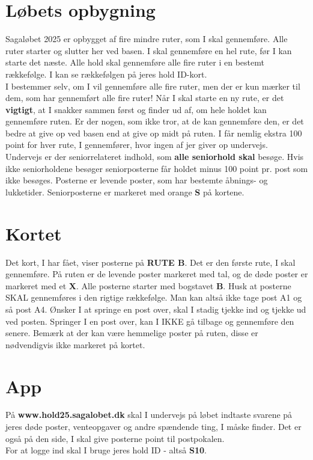 \section{Løbets opbygning}
Sagaløbet 2025 er opbygget af fire mindre ruter, som I skal gennemføre. Alle ruter starter og slutter her ved basen. I skal gennemføre en hel rute, før I kan starte det næste. Alle hold skal gennemføre alle fire ruter i en bestemt rækkefølge. I kan se rækkefølgen på jeres hold ID-kort.\\\newline
I bestemmer selv, om I vil gennemføre alle fire ruter, men der er kun mærker til dem, som har gennemført alle fire ruter! Når I skal starte en ny rute, er det \textbf{vigtigt}, at I snakker sammen først og finder ud af, om hele holdet kan gennemføre ruten. Er der nogen, som ikke tror, at de kan gennemføre den, er det bedre at give op ved basen end at give op midt på ruten. I får nemlig ekstra 100 point for hver rute, I gennemfører, hvor ingen af jer giver op undervejs.\\
\newline
Undervejs er der seniorrelateret indhold, som \textbf{alle seniorhold skal} besøge. Hvis ikke seniorholdene besøger seniorposterne får holdet minus 100 point pr. post som ikke besøges. Posterne er levende poster, som har bestemte åbnings- og lukketider. Seniorposterne er markeret med orange \textbf{S} på kortene.\\
\newline
\section{Kortet}
Det kort, I har fået, viser posterne på \textbf{RUTE B}. Det er den første rute, I skal gennemføre. På ruten er de levende poster markeret med tal, og de døde poster er markeret med et \textbf{X}. Alle posterne starter med bogstavet \textbf{B}. Husk at posterne SKAL gennemføres i den rigtige rækkefølge. Man kan altså ikke tage post A1 og så post A4. Ønsker I at springe en post over, skal I stadig tjekke ind og tjekke ud ved posten. Springer I en post over, kan I IKKE gå tilbage og gennemføre den senere. Bemærk at der kan være hemmelige poster på ruten, disse er nødvendigvis ikke markeret på kortet.
\section{App}
På \textbf{www.hold25.sagalobet.dk} skal I undervejs på løbet indtaste svarene på jeres døde poster, venteopgaver og andre spændende ting, I måske finder. Det er også på den side, I skal give posterne point til postpokalen.\\
For at logge ind skal I bruge jeres hold ID - altså \textbf{S10}.
\newpage
